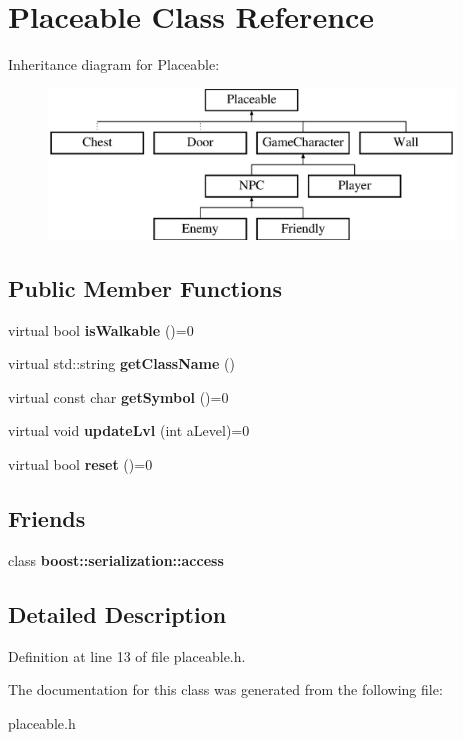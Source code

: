 \hypertarget{class_placeable}{}\section{Placeable Class Reference}
\label{class_placeable}
Inheritance diagram for Placeable\+:\begin{figure}[H]
\begin{center}
\leavevmode
\includegraphics[height=4.000000cm]{class_placeable}
\end{center}
\end{figure}
\subsection*{Public Member Functions}
\begin{DoxyCompactItemize}
\item 
\hypertarget{class_placeable_ac044b1aa2e26da04892ca79ab1082e75}{}\label{class_placeable_ac044b1aa2e26da04892ca79ab1082e75} 
virtual bool {\bfseries is\+Walkable} ()=0
\item 
\hypertarget{class_placeable_afbea2399c9d303b4b0d339cbb85e438b}{}\label{class_placeable_afbea2399c9d303b4b0d339cbb85e438b} 
virtual std\+::string {\bfseries get\+Class\+Name} ()
\item 
\hypertarget{class_placeable_a59b01c6e15b33025d4c46c475654178b}{}\label{class_placeable_a59b01c6e15b33025d4c46c475654178b} 
virtual const char {\bfseries get\+Symbol} ()=0
\item 
\hypertarget{class_placeable_a415577ef15fc368e9d340d2bc3c01bec}{}\label{class_placeable_a415577ef15fc368e9d340d2bc3c01bec} 
virtual void {\bfseries update\+Lvl} (int a\+Level)=0
\item 
\hypertarget{class_placeable_ae1161133792a3fe4d5f5bc60cfbc3a3f}{}\label{class_placeable_ae1161133792a3fe4d5f5bc60cfbc3a3f} 
virtual bool {\bfseries reset} ()=0
\end{DoxyCompactItemize}
\subsection*{Friends}
\begin{DoxyCompactItemize}
\item 
\hypertarget{class_placeable_ac98d07dd8f7b70e16ccb9a01abf56b9c}{}\label{class_placeable_ac98d07dd8f7b70e16ccb9a01abf56b9c} 
class {\bfseries boost\+::serialization\+::access}
\end{DoxyCompactItemize}


\subsection{Detailed Description}


Definition at line 13 of file placeable.\+h.



The documentation for this class was generated from the following file\+:\begin{DoxyCompactItemize}
\item 
placeable.\+h\end{DoxyCompactItemize}
